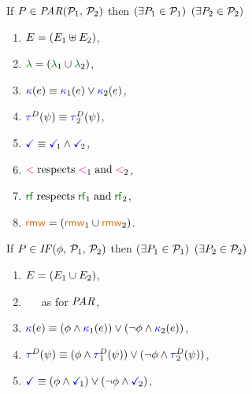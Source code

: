\begin{scope}
  \noindent
  If $\aPS \in \sPAR{\aPSS_1}{\aPSS_2}$ then  
  $(\exists P_1\in\mathcal{P}_1)$ $(\exists P_2\in\mathcal{P}_2)$
  \begin{multicols}{2}
    \begin{enumerate}[topsep=0pt,label=(\textsc{p}\arabic*),ref=\textsc{p}\arabic*]
    \item \label{par-E}
      $E = (E_1\uplus E_2)$,
    \item \label{par-lambda}
      ${\labeling}=\PBR{{\labeling_1}\cup {\labeling_2}}$, 
    \item \label{par-kappa}
      ${\color{blue}\kappa}(e) \mathrel{\equiv} {\color{blue}\kappa}_1(e)\lor {\color{blue}\kappa}_2(e)$,
    \item \label{par-tau}
      $\aTr{\bEvs}{\bForm} \riff \aTr[2]{\bEvs}{\bForm}$,
    \item \label{par-term}
      $\aTerm \riff \aTerm[1]\land\aTerm[2]$,
    \item \label{par-le}
      ${\lt}\rextends{\lt_1}{\lt_2}$,
    \item \label{par-rf}
      ${\rrfx}\rextends{\rrfx_1}{\rrfx_2}$,
      \setcounter{enumi}{\value{Brmw}}
    \item \label{par-rmw}
      ${\rrmw}=\PBR{{\rrmw_1}\cup{\rrmw_2}}$.
    \end{enumerate}
  \end{multicols}
  \medskip

  \noindent
  If $\aPS \in \sIF{\aForm}\sTHEN\aPSS_1\sELSE\aPSS_2\sFI$ then
  $(\exists P_1\in\mathcal{P}_1)$ $(\exists P_2\in\mathcal{P}_2)$
  \begin{multicols}{2}
    \begin{enumerate}[topsep=0pt,label=(\textsc{i}\arabic*),ref=\textsc{i}\arabic*]
    \item \label{if-E}
      $E = (E_1\cup E_2)$,
    \item \label{if-lambda}
      \,
      \,
      \, as for $\sPAR{}{}$,
    \item \label{if-kappa}
      ${\color{blue}\kappa}(e) \mathrel{\equiv} (\phi\land{\color{blue}\kappa}_1(e))\lor(\neg\phi\land{\color{blue}\kappa}_2(e))$,
    \item \label{if-tau}
      $\aTr{\bEvs}{\bForm} \riff (\aForm\land\aTr[1]{\bEvs}{\bForm})\lor(\neg\aForm\land\aTr[2]{\bEvs}{\bForm})$,
    \item \label{if-term}
      $\aTerm \riff (\aForm\land\aTerm[1])\lor(\neg\aForm\land\aTerm[2])$,
    \end{enumerate}
  \end{multicols}
  \medskip


\end{scope}
